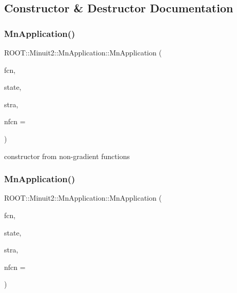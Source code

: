 \subsection{Constructor \& Destructor Documentation}
\mbox{\label{classROOT_1_1Minuit2_1_1MnApplication_ac3bea3d025068f8bc7d8a6701f23aa81}} 
\subsubsection{\texorpdfstring{MnApplication()}{MnApplication()}\hspace{0.1cm}{\footnotesize\ttfamily [1/4]}}
{\footnotesize\ttfamily R\+O\+O\+T\+::\+Minuit2\+::\+Mn\+Application\+::\+Mn\+Application (\begin{DoxyParamCaption}\item[{const \mbox{\hyperlink{classROOT_1_1Minuit2_1_1FCNBase}{F\+C\+N\+Base}} \&}]{fcn,  }\item[{const \mbox{\hyperlink{classROOT_1_1Minuit2_1_1MnUserParameterState}{Mn\+User\+Parameter\+State}} \&}]{state,  }\item[{const \mbox{\hyperlink{classROOT_1_1Minuit2_1_1MnStrategy}{Mn\+Strategy}} \&}]{stra,  }\item[{unsigned int}]{nfcn = {} }\end{DoxyParamCaption})}



constructor from non-\/gradient functions 

\mbox{\label{classROOT_1_1Minuit2_1_1MnApplication_a07b6eb3c240c0d2360d466ab1f1a85ec}} 
\subsubsection{\texorpdfstring{MnApplication()}{MnApplication()}\hspace{0.1cm}{\footnotesize\ttfamily [2/4]}}
{\footnotesize\ttfamily R\+O\+O\+T\+::\+Minuit2\+::\+Mn\+Application\+::\+Mn\+Application (\begin{DoxyParamCaption}\item[{const \mbox{\hyperlink{classROOT_1_1Minuit2_1_1FCNGradientBase}{F\+C\+N\+Gradient\+Base}} \&}]{fcn,  }\item[{const \mbox{\hyperlink{classROOT_1_1Minuit2_1_1MnUserParameterState}{Mn\+User\+Parameter\+State}} \&}]{state,  }\item[{const \mbox{\hyperlink{classROOT_1_1Minuit2_1_1MnStrategy}{Mn\+Strategy}} \&}]{stra,  }\item[{unsigned int}]{nfcn = {} }\end{DoxyParamCaption})}



